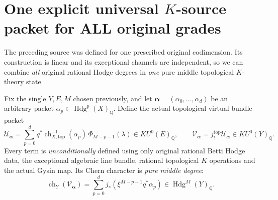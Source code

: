 \documentclass[11pt]{article}
\newcommand{\Q}{\mathbb Q}
\newcommand{\Hdg}{\operatorname{Hdg}}
\newcommand{\ch}{\operatorname{ch}}
\begin{document}
\section{One explicit universal \(K\)-source packet for ALL original grades}
The preceding source was defined for one prescribed
original codimension. Its construction is linear
and its exceptional channels are independent,
so we can combine \emph{all} original rational
Hodge degrees in \emph{one} pure middle
topological \(K\)-theory state.

Fix the single \(Y,E,M\) chosen previously,
and let \(\boldsymbol\alpha=(\alpha_0,\ldots,\alpha_d)\)
be an arbitrary packet
\(\alpha_p\in\Hdg^p(X)_{\Q}\).
Define the actual topological virtual
bundle packet
\[
 \boxed{
 \mathcal U_{\boldsymbol\alpha}
 =\sum_{p=0}^d
  q^*\ch_{X,\mathrm{top}}^{-1}(\alpha_p)\,
  \Phi_{M-p-1}(\lambda)\in KU^0(E)_\Q,
 \qquad
 \mathcal V_{\boldsymbol\alpha}
  =j_!^{\mathrm{top}}\mathcal U_{\boldsymbol\alpha}
  \in KU^0(Y)_\Q.}
 \tag{6.1}
\]
Every term is \emph{unconditionally} defined
using only original rational Betti Hodge
data, the exceptional algebraic
line bundle, rational topological \(K\)
operations and the actual Gysin map.
Its Chern character is \emph{pure
middle degree}:
\[
 \boxed{\ch_Y(\mathcal V_{\boldsymbol\alpha})
   =\sum_{p=0}^d
    j_*(\xi^{M-p-1}q^*\alpha_p)
   \in\Hdg^M(Y)_\Q.}
 \tag{6.2}
\]
\end{document}
